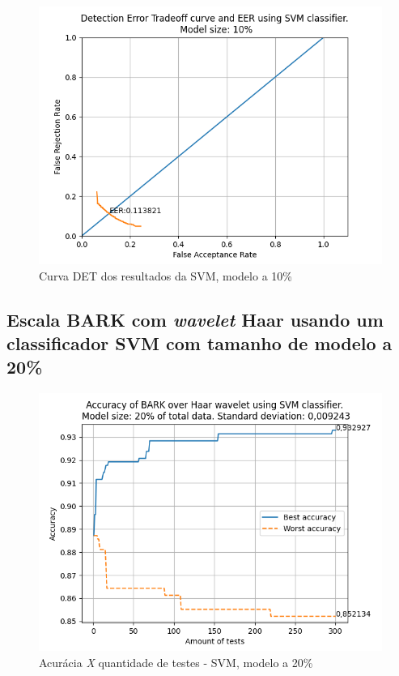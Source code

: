 			\begin{figure}[h]
				\centering
				\includegraphics[width=\linewidth]{images/results/det/DET_SVM_10}
				\caption{Curva DET dos resultados da SVM, modelo a 10\%}
				\label{fig:detsvm10}
			\end{figure}

			\forceNewPage
		\subsection{Escala BARK com \textit{wavelet} Haar usando um classificador SVM com tamanho de modelo a 20\%}
			\begin{figure}[ht]
				\centering
				\includegraphics{images/results/confusionMatrices/classifier_SVM_20.png}
				\caption{Acurácia \textit{X} quantidade de testes - SVM, modelo a 20\%}
				\label{fig:classifiersvm20}
			\end{figure}
		
